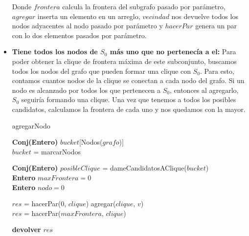 \begin{itemize}
Donde $frontera$ calcula la frontera del subgrafo pasado por parámetro, $agregar$ inserta un elemento en un arreglo, $vecindad$ nos devuelve todos los nodos adyacentes al nodo pasado por parámetro y $hacerPar$ genera un par con lo dos elementos pasados por parámetro. \newline


\item \textbf{Tiene todos los nodos de $S_{0}$ más uno que no pertenecía a el:} \newline
Para poder obtener la clique de frontera máxima de este subconjunto, buscamos todos los nodos del grafo que pueden formar una clique con $S_{0}$. Para esto, contamos cuantos nodos de la clique se conectan a cada nodo del grafo. Si un nodo es alcanzado por todos los que pertenecen a $S_{0}$, entonces al agregarlo, $S_{0}$ seguiría formando una clique. Una vez que tenemos a todos los posibles candidatos, calculamos la frontera de cada uno y nos quedamos con la mayor. \newline

\begin{algorithm}[H]
    \SetAlgoLined
    \caption{agregarNodo}
	
    \textbf{Conj(Entero)} $bucket[$Nodos($grafo$)$]$  \\
	
    $bucket$ = marcarNodos
	
    \textbf{Conj(Entero)} $posibleClique$ = dameCandidatosAClique($bucket$)\\
   
    \textbf{Entero} $maxFrontera = 0$ \\
    \textbf{Entero} $nodo = 0$ \\



	{$res$ = hacerPar(0, $clique$)}
    {	agregar($clique$, $v$) \\
	$res$ = hacerPar($maxFrontera$, $clique$) }

    \textbf{devolver} $res$ \\
\end{algorithm}


\end{itemize}
